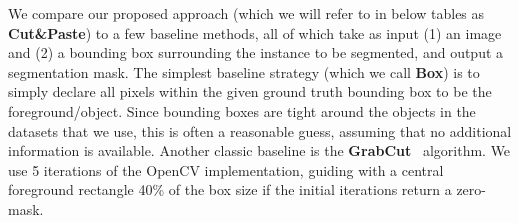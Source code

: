 \documentclass[runningheads]{llncs}
\begin{document}
We compare our proposed approach (which we will refer to in below tables as
{\bf Cut\&Paste}) to a few baseline methods, all of which take as input (1) an image and (2) a bounding box surrounding the
instance to be segmented, and output a segmentation mask.
The simplest baseline strategy (which we call {\bf Box}) is to simply declare 
all pixels within the given ground truth bounding box to be the foreground/object. Since bounding boxes are tight around the objects in the datasets that we use, this is often a reasonable guess, assuming that no additional information is available.
%
Another classic baseline is the {\bf GrabCut}~\cite{rother2004grabcut} algorithm. We use 5 iterations of the OpenCV implementation, guiding with a central foreground rectangle 40\% of the box size if the initial iterations return a zero-mask.
\end{document}
